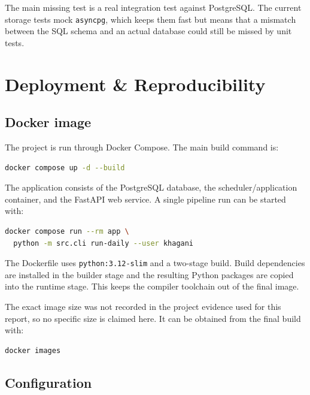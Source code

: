\documentclass[11pt,a4paper]{article}
\begin{document}
The main missing test is a real integration test against PostgreSQL. The current storage tests mock \texttt{asyncpg}, which keeps them fast but means that a mismatch between the SQL schema and an actual database could still be missed by unit tests.

\section{Deployment \& Reproducibility}\label{sec:deploy}

\subsection{Docker image}

The project is run through Docker Compose. The main build command is:

\begin{lstlisting}[style=python,language=bash,numbers=none]
docker compose up -d --build
\end{lstlisting}

The application consists of the PostgreSQL database, the scheduler/application container, and the FastAPI web service. A single pipeline run can be started with:

\begin{lstlisting}[style=python,language=bash,numbers=none]
docker compose run --rm app \
  python -m src.cli run-daily --user khagani
\end{lstlisting}

The Dockerfile uses \texttt{python:3.12-slim} and a two-stage build. Build dependencies are installed in the builder stage and the resulting Python packages are copied into the runtime stage. This keeps the compiler toolchain out of the final image.

The exact image size was not recorded in the project evidence used for this report, so no specific size is claimed here. It can be obtained from the final build with:

\begin{lstlisting}[style=python,language=bash,numbers=none]
docker images
\end{lstlisting}

\subsection{Configuration}
\end{document}
